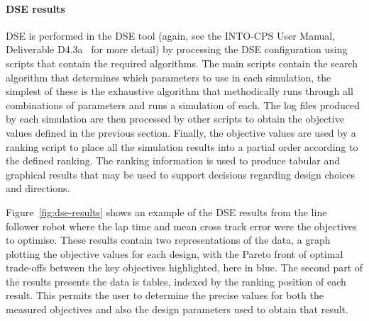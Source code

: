 \paragraph{DSE results}

DSE is performed in the DSE tool (again, see the INTO-CPS User Manual, Deliverable D4.3a~\cite{INTOCPSD4.3a} for more detail) by processing the DSE configuration using scripts that contain the required algorithms.  The main scripts contain the search algorithm that determines which parameters to use in each simulation, the simplest of these is the exhaustive algorithm that methodically runs through all combinations of parameters and runs a simulation of each.  The log files produced by each simulation are then processed by other scripts to obtain the objective values defined in the previous section.  Finally, the objective values are used by a ranking script to place all the simulation results into a partial order according to the defined ranking.  The ranking information is used to produce tabular and graphical results that may be used to support decisions regarding design choices and directions.

Figure~\ref{fig:dse-results} shows an example of the DSE results from the line follower robot where the lap time and mean cross track error were the objectives to optimise.  These results contain two representations of the data, a graph plotting the objective values for each design, with the Pareto front of optimal trade-offs between the key objectives highlighted, here in blue. The second part of the results presents the data is tables, indexed by the ranking position of each result.  This permits the user to determine the precise values for both the measured objectives and also the design parameters used to obtain that result.

